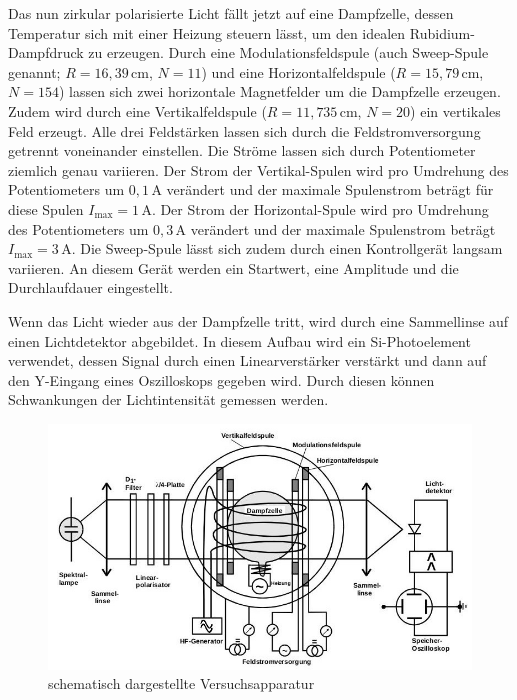 Das nun zirkular polarisierte Licht fällt jetzt auf eine Dampfzelle, dessen Temperatur sich mit einer Heizung steuern lässt, um den idealen Rubidium-Dampfdruck zu erzeugen.
Durch eine Modulationsfeldspule (auch Sweep-Spule genannt; $R=16,39\,\text{cm}$, $N=11$) und eine Horizontalfeldspule ($R=15,79\,\text{cm}$, $N=154$) lassen sich zwei horizontale Magnetfelder um die Dampfzelle erzeugen. Zudem wird durch eine Vertikalfeldspule ($R=11,735\,\text{cm}$, $N=20$) ein vertikales Feld erzeugt. Alle drei Feldstärken lassen sich durch die Feldstromversorgung getrennt voneinander einstellen. Die Ströme lassen sich durch Potentiometer ziemlich genau variieren. Der Strom der Vertikal-Spulen wird pro Umdrehung des Potentiometers um $0,1\,\text{A}$ verändert und der maximale Spulenstrom beträgt für diese Spulen $I_\text{max}=1\,\text{A}$.  Der Strom der Horizontal-Spule wird pro Umdrehung des Potentiometers um $0,3\,\text{A}$ verändert und der maximale Spulenstrom beträgt  $I_\text{max}=3\,\text{A}$.
Die Sweep-Spule lässt sich zudem durch einen Kontrollgerät langsam variieren. An diesem Gerät werden ein Startwert, eine Amplitude und die Durchlaufdauer eingestellt.

Wenn das Licht wieder aus der Dampfzelle tritt, wird durch eine Sammellinse auf einen Lichtdetektor abgebildet. In diesem Aufbau wird ein Si-Photoelement verwendet, dessen Signal durch einen Linearverstärker verstärkt und dann auf den Y-Eingang eines Oszilloskops gegeben wird. Durch diesen können Schwankungen der Lichtintensität gemessen werden.
 
 \begin{figure}[H]
	\centering
	\includegraphics[width=12cm]{aufbau.jpg}
	\caption{schematisch dargestellte Versuchsapparatur \cite{V21}}
	\label{abb:aufbau}
\end{figure}

